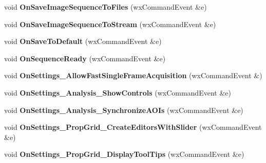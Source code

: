 \begin{DoxyCompactItemize}
\item 
\hypertarget{class_prop_view_frame_a9322540c592b388b909fc87ee0344740}{void {\bfseries On\+Save\+Image\+Sequence\+To\+Files} (wx\+Command\+Event \&e)}\label{class_prop_view_frame_a9322540c592b388b909fc87ee0344740}

\item 
\hypertarget{class_prop_view_frame_a2518d19b06414c362b3a5b7f575ba355}{void {\bfseries On\+Save\+Image\+Sequence\+To\+Stream} (wx\+Command\+Event \&e)}\label{class_prop_view_frame_a2518d19b06414c362b3a5b7f575ba355}

\item 
\hypertarget{class_prop_view_frame_a8e016d4a150e289b355c09e3698e758c}{void {\bfseries On\+Save\+To\+Default} (wx\+Command\+Event \&e)}\label{class_prop_view_frame_a8e016d4a150e289b355c09e3698e758c}

\item 
\hypertarget{class_prop_view_frame_aca2784286623468b37dba7ffe0f0bbc1}{void {\bfseries On\+Sequence\+Ready} (wx\+Command\+Event \&e)}\label{class_prop_view_frame_aca2784286623468b37dba7ffe0f0bbc1}

\item 
\hypertarget{class_prop_view_frame_a027c64a2666bf5ca381dab1d1ecc6ac3}{void {\bfseries On\+Settings\+\_\+\+Allow\+Fast\+Single\+Frame\+Acquisition} (wx\+Command\+Event \&)}\label{class_prop_view_frame_a027c64a2666bf5ca381dab1d1ecc6ac3}

\item 
\hypertarget{class_prop_view_frame_aaac23185bb52ebff1b0094e89d33f751}{void {\bfseries On\+Settings\+\_\+\+Analysis\+\_\+\+Show\+Controls} (wx\+Command\+Event \&e)}\label{class_prop_view_frame_aaac23185bb52ebff1b0094e89d33f751}

\item 
\hypertarget{class_prop_view_frame_aa6ee380fb9cf1ebc857571d3c15826b2}{void {\bfseries On\+Settings\+\_\+\+Analysis\+\_\+\+Synchronize\+A\+O\+Is} (wx\+Command\+Event \&e)}\label{class_prop_view_frame_aa6ee380fb9cf1ebc857571d3c15826b2}

\item 
\hypertarget{class_prop_view_frame_a16f1f439589678003172391020514856}{void {\bfseries On\+Settings\+\_\+\+Prop\+Grid\+\_\+\+Create\+Editors\+With\+Slider} (wx\+Command\+Event \&e)}\label{class_prop_view_frame_a16f1f439589678003172391020514856}

\item 
\hypertarget{class_prop_view_frame_a3e2ff3625369b2feb9f51be909c68026}{void {\bfseries On\+Settings\+\_\+\+Prop\+Grid\+\_\+\+Display\+Tool\+Tips} (wx\+Command\+Event \&e)}\label{class_prop_view_frame_a3e2ff3625369b2feb9f51be909c68026}


\end{DoxyCompactItemize}
